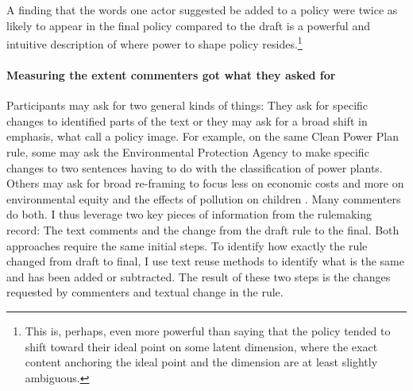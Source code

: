 A finding that the words one actor suggested be added to a policy were twice as likely to appear in the final policy compared to the draft is a powerful and intuitive description of where power to shape policy resides.\footnote{This is, perhaps, even more powerful than saying that the policy tended to shift toward their ideal point on some latent dimension, where the exact content anchoring the ideal point and the dimension are at least slightly ambiguous.}

\paragraph{Measuring the extent commenters got what they asked for}

Participants may ask for two general kinds of things: They ask for specific changes to identified parts of the text or they may ask for a broad shift in emphasis, what \citet{Jones2005} call a policy image. For example, on the same Clean Power Plan rule, some may ask the Environmental Protection Agency to make specific changes to two sentences having to do with the classification of power plants. %
Others may ask for broad re-framing to focus less on economic costs and more on environmental equity and the effects of pollution on children \citep{Rinfret2011}. Many commenters do both. 
I thus leverage two key pieces of information from the rulemaking record: The text comments and the change from the draft rule to the final. %
Both approaches require the same initial steps. To identify how exactly the rule changed from draft to final, I use text reuse methods to identify what is the same and has been added or subtracted. 
The result of these two steps is the changes requested by commenters and textual change in the rule. 

